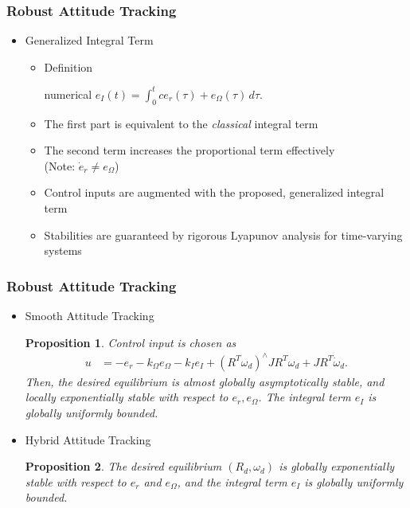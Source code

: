 \documentclass[11pt,professionalfonts,hyperref={pdftex,pdfpagemode=none,pdfstartview=FitH}]{beamer}
\newtheorem{prop}{Proposition}
\begin{document}
\begin{frame}
\frametitle{Robust Attitude Tracking}

\begin{itemize}
\item Generalized Integral Term
\begin{itemize}
\item Definition

\begin{center}\hspace*{0.01cm}
\begin{beamercolorbox}[wd=8cm,dp=0.15cm,ht=1.1cm,sep=0.05cm,center,shade=on]{numerical}
$e_I(t) = \displaystyle\int_{0}^t ce_r(\tau)+e_\Omega(\tau) \,d\tau.$
\end{beamercolorbox}
\end{center}

%
%
\item The first part is equivalent to the \textit{classical} integral term
\item The second term increases the proportional term effectively\\
(Note: $\dot e_r \neq e_\Omega$) 
\pause\vspace*{0.3cm}
\item Control inputs are augmented with the proposed, generalized integral term
\item Stabilities are guaranteed by rigorous Lyapunov analysis for time-varying systems
\end{itemize}
\end{itemize}
\end{frame}


\begin{frame}
\frametitle{Robust Attitude Tracking}

\begin{itemize}
\item Smooth Attitude Tracking
\begin{prop}\label{prop:RAGAS}
Control input is chosen as
{\small
\begin{align*}
u & = -e_r -k_\Omega e_\Omega -k_I e_I+(R^T\omega_d)^\wedge JR^T\omega_d
+ JR^T\dot\omega_d.\label{eqn:uI}
\end{align*}}
Then, the desired equilibrium is almost globally asymptotically stable, and locally exponentially stable with respect to $e_r,e_\Omega$. The integral term $e_I$ is globally uniformly bounded.
\end{prop}
\pause\vspace*{0.1cm}
\item Hybrid Attitude Tracking
\begin{prop}
The desired equilibrium $(R_d,\omega_d)$ is globally exponentially stable with respect to $e_r$ and $e_\Omega$, and the integral term $e_{I}$ is globally uniformly bounded.
\end{prop}
\end{itemize}

\end{frame}
\end{document}
